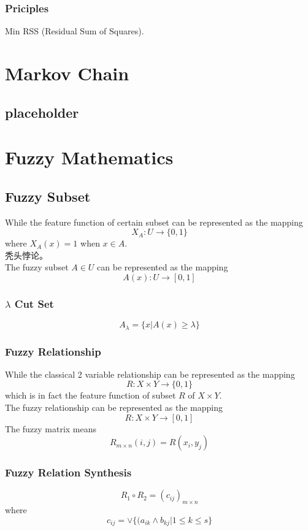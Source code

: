 \documentclass[12pt,a4paper]{article} \usepackage{kurier}
\begin{document}
\begin{CJK}{UTF8}{gkai}
\begin{multicols}{2}
		\subsubsection{Priciples}
			Min RSS (Residual Sum of Squares).
\end{multicols}
	
\section{Markov Chain}
\begin{multicols}{2}
	\subsection{placeholder}
\end{multicols}

\section{Fuzzy Mathematics}
\begin{multicols}{2}
	\subsection{Fuzzy Subset}
		While the feature function of certain subset can be represented as the mapping
		\[ X_A : U \to \{0,1\} \]
		where $ X_A (x) = 1 $ when $ x \in A $.\\
		秃头悖论。\\
		The fuzzy subset $A \in U$ can be represented as the mapping
		\[ A(x): U \to [0,1] \]
		\subsubsection{$\lambda$ Cut Set}
			\[ A_\lambda = \{ x | A(x) \geqslant \lambda \} \]
		\subsubsection{Fuzzy Relationship}
			While the classical 2 variable relationship can be represented as the mapping
			\[ R : X \times Y \to \{ 0, 1 \} \]
			which is in fact the feature function of subset $R$ of $X \times Y$.\\
			The fuzzy relationship can be represented as the mapping
			\[ R : X \times Y \to [ 0, 1 ] \]
			The fuzzy matrix means \[ R_{m\times n}(i,j) = R(x_i,y_j) \]
		\subsubsection{Fuzzy Relation Synthesis}
			\[ R_1 \circ R_2 = (c_{ij})_{m\times n} \]
			where
			\[ c_{ij} = \vee \{ (a_{ik} \wedge b_{kj} | 1 \leq k \leq s \}\]

\end{multicols}
\end{CJK}
\end{document}
